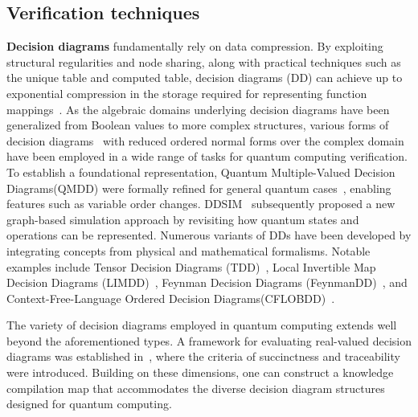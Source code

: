 \documentclass[a4paper,onecolumn,11pt,unpublished]{quantumarticle}
\begin{document}
\subsection{Verification techniques}
\textbf{Decision diagrams} fundamentally rely on data compression. By exploiting structural regularities and node sharing, along with practical techniques such as the unique table and computed table, decision diagrams (DD) can achieve up to exponential compression in the storage required for representing function mappings~\cite{BryantROBDD1986}. As the algebraic domains underlying decision diagrams have been generalized from Boolean values to more complex structures, various forms of decision diagrams~\cite{NiemannQMDD2016, HongTDD2022, SistlaCFLOBDD2024, WilleDD2023} with reduced ordered normal forms over the complex domain have been employed in a wide range of tasks for quantum computing verification. To establish a foundational representation, Quantum Multiple-Valued Decision Diagrams(QMDD) were formally refined for general quantum cases~\cite{NiemannQMDD2016}, enabling features such as variable order changes. DDSIM~\cite{wille2019advanced} subsequently proposed a new graph-based simulation approach by revisiting how quantum states and operations can be represented. Numerous variants of DDs have been developed by integrating concepts from physical and mathematical formalisms. Notable examples include Tensor Decision Diagrams (TDD)~\cite{HongTDD2022}, Local Invertible Map Decision Diagrams (LIMDD)~\cite{Vinkhuijzen2023limdddecision}, Feynman Decision Diagrams (FeynmanDD)~\cite{wang2025FeynmanDD}, and Context-Free-Language Ordered Decision Diagrams(CFLOBDD)~\cite{SistlaCFLOBDD2024}.

The variety of decision diagrams employed in quantum computing extends well beyond the aforementioned types. A framework for evaluating real-valued decision diagrams was established in~\cite{FargierKnowledge2014}, where the criteria of succinctness and traceability were introduced. Building on these dimensions, one can construct a knowledge compilation map that accommodates the diverse decision diagram structures designed for quantum computing.
\end{document}
